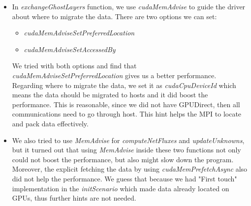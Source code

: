\documentclass[article]{scrartcl}
\begin{document}
\begin{itemize}
	\item In \textit{exchangeGhostLayers} function, we use \textit{cudaMemAdvise} to guide the driver about where to migrate the data.
	There are two options we can set: 
		\begin{itemize}
			\item \textit{cudaMemAdviseSetPreferredLocation}
			\item \textit{cudaMemAdviseSetAccessedBy}
	\end{itemize}
	We tried with both options and find that \textit{cudaMemAdviseSetPreferredLocation} gives us a better performance. Regarding where to migrate the data, we set it as \textit{cudaCpuDeviceId} which means the data should be migrated to hosts and it did boost the performance. This is reasonable, since we did not have GPUDirect, then all communications need to go through host. This hint helps the MPI to locate and pack data effectively. \\
	
	\item We also tried to use \textit{MemAdvise} for \textit{computeNetFluxes} and \textit{updateUnknowns}, but it turned out that using \textit{MemAdvise} inside these two functions not only could not boost the performance, but also might slow down the program. Moreover, the explicit fetching the data by using \textit{cudaMemPrefetchAsync} also did not help the performance. We guess that because we had "First touch" implementation in the \textit{initScenario} which made data already located on GPUs, thus further hints are not needed.  
\end{itemize}
\end{document}
